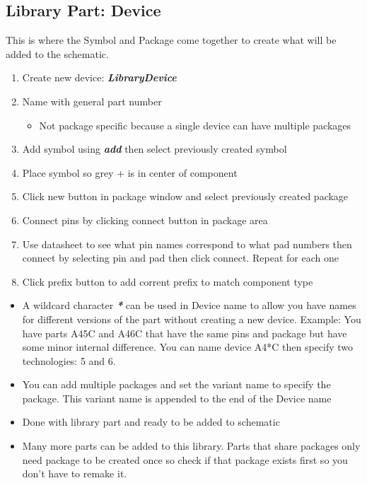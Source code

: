 \documentclass{article}
\begin{document}
\subsection{Library Part: Device}
This is where the Symbol and Package come together to create what will be
added to the schematic.
\begin{enumerate}
    \item Create new device: \textit{\textbf{Library\textrightarrow Device}}
    \item Name with general part number
    \begin{itemize}
        \item Not package specific because a single device can have multiple
        packages
    \end{itemize}
    \item Add symbol using \textit{\textbf{add}} then select previously created
    symbol
    \item Place symbol so grey + is in center of component
    \item Click new button in package window and select previously created
    package
    \item Connect pins by clicking connect button in package area
    \item Use datasheet to see what pin names correspond to what pad numbers
    then connect by selecting pin and pad then click connect. Repeat for each
    one
    \item Click prefix button to add corrent prefix to match component type
\end{enumerate}
\begin{tcolorbox} [title=Tips \& Tricks]
    \begin{itemize}
        \item A wildcard character \textit{\textbf{*}} can be used in Device
        name to allow you have names for different versions of the part without
        creating a new device. Example: You have parts A45C and A46C that have
        the same pins and package but have some minor internal difference. You
        can name device A4*C then specify two technologies: 5 and 6.
        \item You can add multiple packages and set the variant name to specify
        the package. This variant name is appended to the end of the Device
        name
    \end{itemize}
\end{tcolorbox}

\begin{itemize}
    \item Done with library part and ready to be added to schematic
    \item Many more parts can be added to this library. Parts that share
    packages only need package to be created once so check if that package
    exists first so you don't have to remake it.
\end{itemize}
\end{document}
